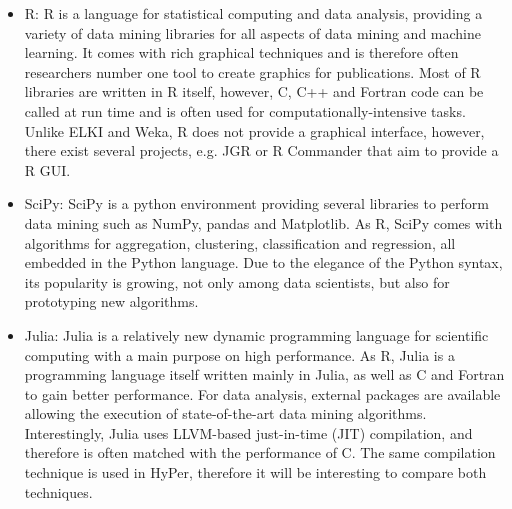 \begin{itemize}
\item R: R is a language for statistical computing and data analysis, providing a variety of data mining libraries for all aspects of data mining and machine learning. It comes with rich graphical techniques and is therefore often researchers number one tool to create graphics for publications. Most of R libraries are written in R itself, however, C, C++ and Fortran code can be called at run time and is often used for computationally-intensive tasks. Unlike ELKI and Weka, R does not provide a graphical interface, however, there exist several projects, e.g. JGR or R Commander that aim to provide a R GUI.

\item SciPy: SciPy is a python environment providing several libraries to perform data mining such as NumPy, pandas and Matplotlib. As R, SciPy comes with algorithms for aggregation, clustering, classification and regression, all embedded in the Python language. Due to the elegance of the Python syntax, its popularity is growing, not only among data scientists, but also for prototyping new algorithms.

\item Julia: Julia is a relatively new dynamic programming language for scientific computing with a main purpose on high performance. As R, Julia is a programming language itself written mainly in Julia, as well as C and Fortran to gain better performance. For data analysis, external packages are available allowing the execution of state-of-the-art data mining algorithms. Interestingly, Julia uses LLVM-based just-in-time (JIT) compilation, and therefore is often matched with the performance of C. The same compilation technique is used in HyPer, therefore it will be interesting to compare both techniques.
\end{itemize}


